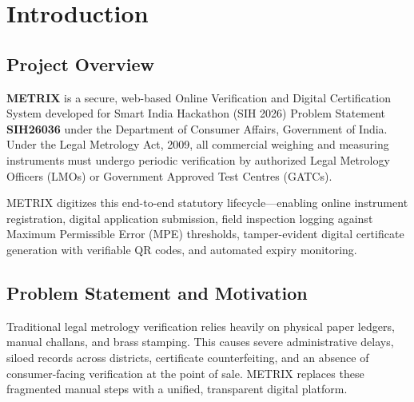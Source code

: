 \chapter{Introduction}

\section{Project Overview}
\textbf{METRIX} is a secure, web-based Online Verification and Digital Certification System developed for Smart India Hackathon (SIH 2026) Problem Statement \textbf{SIH26036} under the Department of Consumer Affairs, Government of India. Under the Legal Metrology Act, 2009, all commercial weighing and measuring instruments must undergo periodic verification by authorized Legal Metrology Officers (LMOs) or Government Approved Test Centres (GATCs). 

METRIX digitizes this end-to-end statutory lifecycle—enabling online instrument registration, digital application submission, field inspection logging against Maximum Permissible Error (MPE) thresholds, tamper-evident digital certificate generation with verifiable QR codes, and automated expiry monitoring.

\section{Problem Statement and Motivation}
Traditional legal metrology verification relies heavily on physical paper ledgers, manual challans, and brass stamping. This causes severe administrative delays, siloed records across districts, certificate counterfeiting, and an absence of consumer-facing verification at the point of sale. METRIX replaces these fragmented manual steps with a unified, transparent digital platform.

